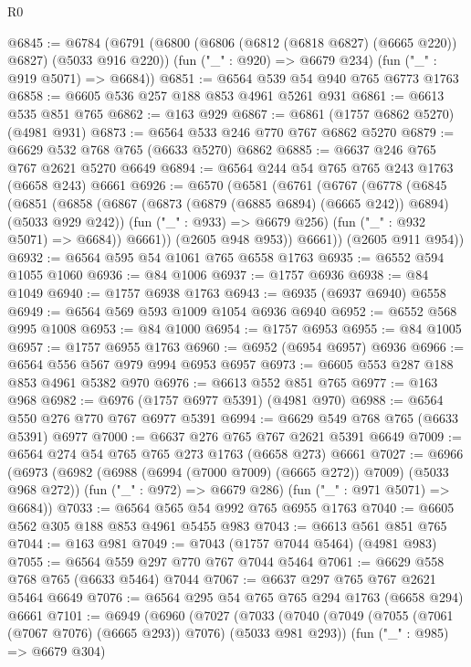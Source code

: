 \begin{lexlean}{R0}
\begin{coremodule}
{{{{{@6845 := @6784
    (@6791
      (@6800 (@6806 (@6812 (@6818 @6827) (@6665 @220)) @6827) (@5033 @916 @220))
      (fun ("_" : @920) => @6679 @234)
      (fun ("_" : @919 @5071) => @6684))
@6851 := @6564 @539 @54 @940 @765 @6773 @1763
@6858 := @6605 @536 @257 @188 @853 @4961 @5261 @931
@6861 := @6613 @535 @851 @765
@6862 := @163 @929
@6867 := @6861 (@1757 @6862 @5270) (@4981 @931)
@6873 := @6564 @533 @246 @770 @767 @6862 @5270
@6879 := @6629 @532 @768 @765 (@6633 @5270) @6862
@6885 := @6637 @246 @765 @767 @2621 @5270 @6649
@6894 := @6564 @244 @54 @765 @765 @243 @1763 (@6658 @243) @6661
@6926 := @6570
    (@6581
      (@6761
        (@6767
          (@6778
            (@6845
              (@6851
                (@6858
                  (@6867 (@6873 (@6879 (@6885 @6894) (@6665 @242)) @6894) (@5033 @929 @242))
                  (fun ("_" : @933) => @6679 @256)
                  (fun ("_" : @932 @5071) => @6684))
                @6661))
            (@2605 @948 @953))
          @6661))
      (@2605 @911 @954))
@6932 := @6564 @595 @54 @1061 @765 @6558 @1763
@6935 := @6552 @594 @1055 @1060
@6936 := @84 @1006
@6937 := @1757 @6936
@6938 := @84 @1049
@6940 := @1757 @6938 @1763
@6943 := @6935 (@6937 @6940) @6558
@6949 := @6564 @569 @593 @1009 @1054 @6936 @6940
@6952 := @6552 @568 @995 @1008
@6953 := @84 @1000
@6954 := @1757 @6953
@6955 := @84 @1005
@6957 := @1757 @6955 @1763
@6960 := @6952 (@6954 @6957) @6936
@6966 := @6564 @556 @567 @979 @994 @6953 @6957
@6973 := @6605 @553 @287 @188 @853 @4961 @5382 @970
@6976 := @6613 @552 @851 @765
@6977 := @163 @968
@6982 := @6976 (@1757 @6977 @5391) (@4981 @970)
@6988 := @6564 @550 @276 @770 @767 @6977 @5391
@6994 := @6629 @549 @768 @765 (@6633 @5391) @6977
@7000 := @6637 @276 @765 @767 @2621 @5391 @6649
@7009 := @6564 @274 @54 @765 @765 @273 @1763 (@6658 @273) @6661
@7027 := @6966
    (@6973
      (@6982 (@6988 (@6994 (@7000 @7009) (@6665 @272)) @7009) (@5033 @968 @272))
      (fun ("_" : @972) => @6679 @286)
      (fun ("_" : @971 @5071) => @6684))
@7033 := @6564 @565 @54 @992 @765 @6955 @1763
@7040 := @6605 @562 @305 @188 @853 @4961 @5455 @983
@7043 := @6613 @561 @851 @765
@7044 := @163 @981
@7049 := @7043 (@1757 @7044 @5464) (@4981 @983)
@7055 := @6564 @559 @297 @770 @767 @7044 @5464
@7061 := @6629 @558 @768 @765 (@6633 @5464) @7044
@7067 := @6637 @297 @765 @767 @2621 @5464 @6649
@7076 := @6564 @295 @54 @765 @765 @294 @1763 (@6658 @294) @6661
@7101 := @6949
    (@6960
      (@7027
        (@7033
          (@7040
            (@7049 (@7055 (@7061 (@7067 @7076) (@6665 @293)) @7076) (@5033 @981 @293))
            (fun ("_" : @985) => @6679 @304)
}}}}}
\end{coremodule}
\end{lexlean}
